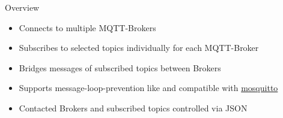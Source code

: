 \begin{frame}{Overview}
\begin{description}[MQTTintegrator]
\begin{itemize}
        \end{itemize}
        \item [MQTTbridge]
        \begin{itemize}
            \item Connects to \alert{multiple} MQTT-\alert{Brokers}
            \item Subscribes to selected \alert{topics individually} for each MQTT-\alert{Broker}
            \item \alert{Bridges messages} of subscribed \alert{topics} between Brokers
            \item Supports \alert{message-loop-prevention} like and compatible with \href{https://mosquitto.org/}{\textcolor{fh-ooe-red}{mosquitto}}
            \item Contacted Brokers and subscribed topics controlled via \alert{JSON}
        \end{itemize}
    \end{description}
\end{frame}
